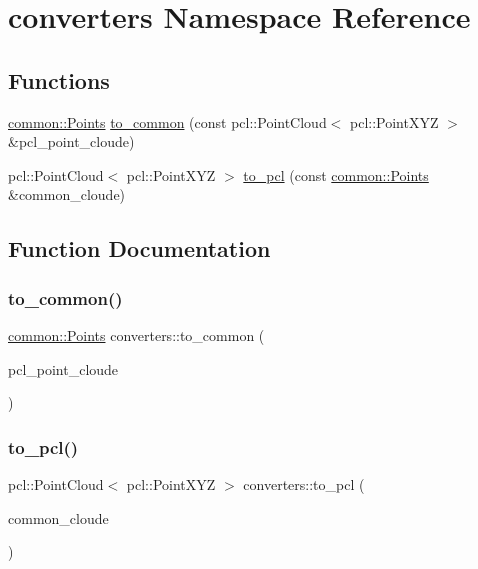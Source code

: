 \hypertarget{namespaceconverters}{}\section{converters Namespace Reference}
\label{namespaceconverters}
\subsection*{Functions}
\begin{DoxyCompactItemize}
\item 
\mbox{\hyperlink{namespacecommon_a1aefa0cce5e127612ab7ca981276ab7e}{common\+::\+Points}} \mbox{\hyperlink{namespaceconverters_ad18e0a8d85226158a8fad96e9f8aac16}{to\+\_\+common}} (const pcl\+::\+Point\+Cloud$<$ pcl\+::\+Point\+X\+YZ $>$ \&pcl\+\_\+point\+\_\+cloude)
\item 
pcl\+::\+Point\+Cloud$<$ pcl\+::\+Point\+X\+YZ $>$ \mbox{\hyperlink{namespaceconverters_a02f93226a37bf374336d1433e01b1284}{to\+\_\+pcl}} (const \mbox{\hyperlink{namespacecommon_a1aefa0cce5e127612ab7ca981276ab7e}{common\+::\+Points}} \&common\+\_\+cloude)
\end{DoxyCompactItemize}


\subsection{Function Documentation}
\mbox{\label{namespaceconverters_ad18e0a8d85226158a8fad96e9f8aac16}} 
\subsubsection{\texorpdfstring{to\+\_\+common()}{to\_common()}}
{\footnotesize\ttfamily \mbox{\hyperlink{namespacecommon_a1aefa0cce5e127612ab7ca981276ab7e}{common\+::\+Points}} converters\+::to\+\_\+common (\begin{DoxyParamCaption}\item[{const pcl\+::\+Point\+Cloud$<$ pcl\+::\+Point\+X\+YZ $>$ \&}]{pcl\+\_\+point\+\_\+cloude }\end{DoxyParamCaption})}

\mbox{\label{namespaceconverters_a02f93226a37bf374336d1433e01b1284}} 
\subsubsection{\texorpdfstring{to\+\_\+pcl()}{to\_pcl()}}
{\footnotesize\ttfamily pcl\+::\+Point\+Cloud$<$ pcl\+::\+Point\+X\+YZ $>$ converters\+::to\+\_\+pcl (\begin{DoxyParamCaption}\item[{const \mbox{\hyperlink{namespacecommon_a1aefa0cce5e127612ab7ca981276ab7e}{common\+::\+Points}} \&}]{common\+\_\+cloude }\end{DoxyParamCaption})}

